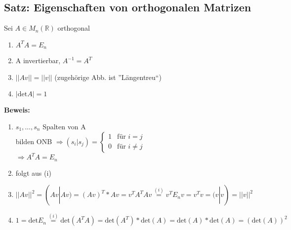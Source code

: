 
\subsection{Satz: Eigenschaften von orthogonalen Matrizen}
Sei $A\in M_n(\mathbb{R})$ orthogonal
\begin{enumerate}
\item $A^TA=E_n$
\item A invertierbar, $A^{-1}=A^T$
\item $||Av||=||v||$ (zugehörige Abb. ist ''Längentreu``)
\item $|\mathrm{det}A|=1$
\end{enumerate}
\textbf{Beweis:}
\begin{enumerate}
\item $s_1,\dots,s_n$ Spalten von A\\
bilden ONB $\Rightarrow (s_i|s_j)=\left\lbrace\begin{array}{ll}
1 & \text{für } i=j\\
0 & \text{für } i\neq j
\end{array}\right.$\\
$\Rightarrow A^TA=E_n$

\item
folgt aus (i)

\item
$||Av||^2 = (Av|Av) = (Av)^T*Av = v^TA^TAv \stackrel{(i)}{=} v^TE_nv = v^Tv = (v|v) = ||v||^2$

\item
$1=\mathrm{det}E_n \stackrel{(i)}{=} \mathrm{det}(A^TA) = \mathrm{det}(A^T)*\mathrm{det}(A) = \mathrm{det}(A)*\mathrm{det}(A) = (\mathrm{det}(A))^2$
\end{enumerate}